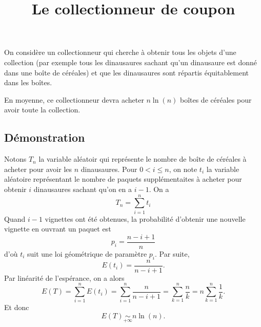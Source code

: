 \documentclass[fontsize=12pt,twoside=false,parskip=half,french]{scrartcl}
\title{Le collectionneur de coupon}
\date{}
\author{}
\begin{document}
\maketitle
    On considère un collectionneur qui cherche à obtenir tous les objets d'une collection
    (par exemple tous les dinausaures sachant qu'un dinausaure est donné dans une boîte de
    céréales) et que les dinausaures sont répartis équitablement dans les boîtes.
   \begin{Theoreme}
      En moyenne, ce collectionneur devra acheter $n \ln (n)$ boîtes de céréales pour
      avoir toute la collection.
   \end{Theoreme}
   \subsection{Démonstration}
     Notons $T_n$ la variable aléatoir qui représente le nombre de boîte de
     céréales à acheter pour avoir les $n$ dinausaures. Pour $0 < i \leq n$, on 
     note $t_i$ la variable aléatoire représentant le nombre de paquets 
     supplémentaites à acheter pour obtenir $i$ dinausaures sachant qu'on en a
     $i - 1$. On a
     \[
        T_n = \sum_{i = 1}^n t_i
     \]
    Quand $i - 1$ vignettes ont été obtenues, la probabilité d'obtenir une 
    nouvelle vignette en ouvrant un paquet est
    \[
      p_i = \frac{n - i + 1}{n}
    \]
    d'où $t_i$ suit une loi géométrique de paramètre $p_i$. Par suite,
    \[
       E(t_i) = \frac{n}{n - i + 1}.
    \]
    Par linéarité de l'espérance, on a alors
    \[
      E(T) = \sum_{i = 1}^n E(t_i) 
           = \sum_{i = 1}^n \frac{n}{n - i + 1}
           = \sum_{k = 1}^n \frac{n}{k}
           = n \sum_{k = 1}^n \frac{1}{k}.
    \]
    Et donc
    \[
      E(T) \underset{+\infty}{\sim} n \ln(n). 
    \]
\end{document}
